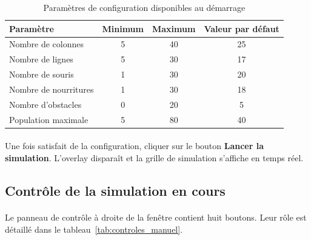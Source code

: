 \begin{table}[h!]
\centering
\renewcommand{\arraystretch}{1.4}
\begin{tabular}{|l|c|c|c|}
\hline
\textbf{Paramètre} & \textbf{Minimum} & \textbf{Maximum} & \textbf{Valeur par défaut} \\
\hline
Nombre de colonnes & 5 & 40 & 25 \\
Nombre de lignes & 5 & 30 & 17 \\
Nombre de souris & 1 & 30 & 20 \\
Nombre de nourritures & 1 & 30 & 18 \\
Nombre d'obstacles & 0 & 20 & 5 \\
Population maximale & 5 & 80 & 40 \\
\hline
\end{tabular}
\caption{Paramètres de configuration disponibles au démarrage}
\label{tab:config_manuel}
\end{table}

\paragraph{} Une fois satisfait de la configuration, cliquer sur le bouton \textbf{Lancer la simulation}. L'overlay disparaît et la grille de simulation s'affiche en temps réel.

\bigskip

\subsection{Contrôle de la simulation en cours}

\paragraph{} Le panneau de contrôle à droite de la fenêtre contient huit boutons. Leur rôle est détaillé dans le tableau~\ref{tab:controles_manuel}.

